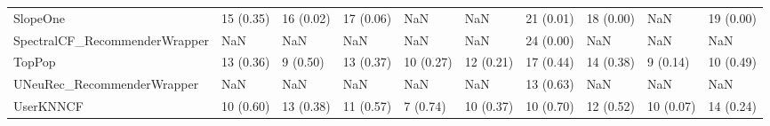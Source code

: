 \begin{tabular}{llllllllll}
                           SlopeOne &                15 (0.35) &   16 (0.02) &     17 (0.06) &          NaN &                  NaN &           21 (0.01) &         18 (0.00) &                NaN &         19 (0.00) \\
      SpectralCF\_RecommenderWrapper &                      NaN &         NaN &           NaN &          NaN &                  NaN &           24 (0.00) &               NaN &                NaN &               NaN \\
                             TopPop &                13 (0.36) &    9 (0.50) &     13 (0.37) &    10 (0.27) &            12 (0.21) &           17 (0.44) &         14 (0.38) &           9 (0.14) &         10 (0.49) \\
         UNeuRec\_RecommenderWrapper &                      NaN &         NaN &           NaN &          NaN &                  NaN &           13 (0.63) &               NaN &                NaN &               NaN \\
                          UserKNNCF &                10 (0.60) &   13 (0.38) &     11 (0.57) &     7 (0.74) &            10 (0.37) &           10 (0.70) &         12 (0.52) &          10 (0.07) &         14 (0.24) \\
\bottomrule
\end{tabular}
